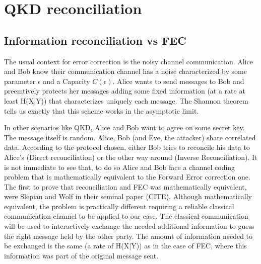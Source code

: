 
%
%
%
%
%
%
%
%



\chapter{QKD reconciliation}\label{chap:qkd_reconciliation}

\section{Information reconciliation vs FEC}

The usual context for error correction is the noisy channel communication. Alice and Bob know their communication channel has a noise characterized by some parameter $\epsilon$ and a Capacity $C(\epsilon)$. Alice wants to send messages to Bob and preemtively protects her messages adding some fixed information (at a rate at least H(X|Y)) that characterizes uniquely each message. The Shannon theorem tells us exactly that this scheme works in the asymptotic limit. 

In other scenarios like QKD, Alice and Bob want to agree on some secret key. The message itself is random. Alice, Bob (and Eve, the attacker) share correlated data. According to the protocol chosen, either Bob tries to reconcile his data to Alice's (Direct reconciliation) or the other way around (Inverse Reconciliation). It is not immediate to see that, to do so Alice and Bob face a channel coding problem that is mathematically equivalent to the Forward Error correction one. The first to prove that reconciliation and FEC was mathematically equivalent, were Slepian and Wolf in their seminal paper (CITE). Although mathematically equivalent, the problem is practically different requiring a reliable classical communication channel to be applied to our case. The classical communication will be used to interactively exchange the needed additional information to guess the right message held by the other party. The amount of information needed to be exchanged is the same (a rate of H(X|Y)) as in the case of FEC, where this information was part of the original message sent. 



